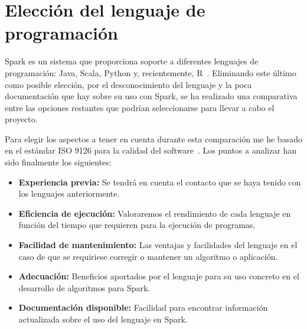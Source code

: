 


\section{Elección del lenguaje de programación}\label{EleccionLenguaje}

Spark es un sistema que proporciona soporte a diferentes lenguajes de programación: Java, Scala, Python y, recientemente, R~\cite{SparkDoc}. Eliminando este último como posible elección, por el desconocimiento del lenguaje y la poca documentación que hay sobre su uso con Spark, se ha realizado una comparativa entre las opciones restantes que podrían seleccionarse para llevar a cabo el proyecto.

Para elegir los aspectos a tener en cuenta durante esta comparación me he basado en el estándar ISO 9126 para la calidad del software~\cite{ISO9126}. Los puntos a analizar han sido finalmente los siguientes: \\

\begin{itemize}
	\item \textbf{Experiencia previa:} Se tendrá en cuenta el contacto que se haya tenido con los lenguajes anteriormente.
	\item \textbf{Eficiencia de ejecución:} Valoraremos el rendimiento de cada lenguaje en función del tiempo que requieren para la ejecución de programas. 
	\item \textbf{Facilidad de mantenimiento:}  Las ventajas y facilidades del lenguaje en el caso de que se requiriese corregir o mantener un algoritmo o aplicación. 
	\item \textbf{Adecuación:} Beneficios aportados por el lenguaje para su uso concreto en el desarrollo de algoritmos para Spark.
	\item \textbf{Documentación disponible:} Facilidad para encontrar información actualizada sobre el uso del lenguaje en Spark.
	
\end{itemize}

